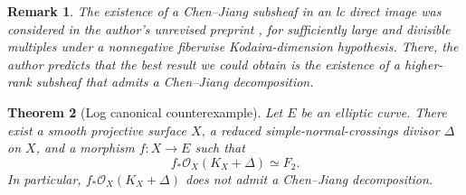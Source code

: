 \documentclass[10pt,a4paper]{amsart}
\newtheorem{theorem}{Theorem}[section]
\newtheorem{remark}[theorem]{Remark}
\newcommand{\OO}{\mathcal O}
\begin{document}
\begin{remark}\label{rem:ammarsubsheaf}
The existence of a Chen--Jiang subsheaf in an lc direct image was considered in the author's unrevised preprint \cite[Proposition 1.4]{Ammar}, for sufficiently large and divisible multiples under a nonnegative fiberwise Kodaira-dimension hypothesis. There, the author predicts that the best result we could obtain is the existence of a higher-rank subsheaf that admits a Chen--Jiang decomposition.
\end{remark}


\begin{theorem}[Log canonical counterexample]\label{thm:lc}
Let $E$ be an elliptic curve. There exist a smooth projective surface $X$, a reduced simple-normal-crossings divisor $\Delta$ on $X$, and a morphism $f:X\to E$ such that
\[
f_*\OO_X(K_X+\Delta)\simeq F_2.
\]
In particular, $f_*\OO_X(K_X+\Delta)$ does not admit a Chen--Jiang decomposition.
\end{theorem}
\end{document}
